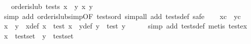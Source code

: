 \begin{isabellebody}
\ \ \ {}order{}is{}lub\ tests\ {}x\ {}\ y{}\ {}x{}\ y{}{}\isanewline
%
\isadelimproof
%
\endisadelimproof
%
\isatagproof
{}\isamarkupfalse%
\ {}simp\ add{}\ order{}is{}lub{}simp{}OF\ tests{}ord{}{}\ simp{}all\ add{}\ tests{}def{}\ safe{}\isanewline
\ \ \isamarkupfalse%
\ xc\ \ yc\ \isamarkupfalse%
\ x{}\ \ y{}\ \ x{}{}def{}\ {}x\ {}\ test\ x{}{}\ \ y{}{}def{}\ {}y\ {}\ test\ y{}{}\isanewline
\ \ \ \ \isamarkupfalse%
\ {}simp\ add{}\ tests{}def{}\ metis\ test{}ex{}\isanewline
\isanewline
\ \ \isamarkupfalse%
\ {}x\ {}\ test{}set{}\ \ {}y\ {}\ test{}set{}\isanewline
\ \ \ \ \isamarkupfalse%

\end{isabellebody}
